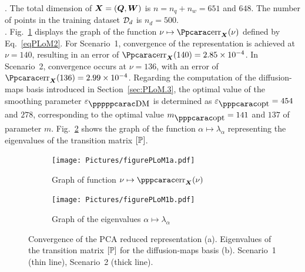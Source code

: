 .
The total dimension of ${\boldsymbol{X}} = ({\boldsymbol{Q}},{\boldsymbol{W}})$ is $n = n_q + n_w = 651$ and $648$. The number of points in the training dataset ${\mathcal{D}}_d$ is $n_d=500$.\\

.
Fig.~\ref{fig:figurePLoM1a} displays the graph of the function  $\nu\mapsto \err_\bfX(\nu)$ defined by Eq.~\eqref{eqPLoM2}.
For Scenario~1, convergence of the representation is achieved at $\nu=140$, resulting in an error of $\err_\bfX(140) = 2.85\times 10^{-4}$. In
Scenario~2, convergence occurs at $\nu=136$,  with an error of $\err_\bfX(136) = 2.99\times 10^{-4}$.
%
Regarding  the computation of the diffusion-maps basis introduced in Section~\ref{sec:PLoM.3}, the optimal value of the smoothing parameter $\varepsilon_\DM$ is determined as $\varepsilon_\opt = 454$ and $278$, corresponding to the optimal value $m_\opt = 141$ and $137$ of parameter $m$. Fig.~\ref{fig:figurePLoM1b} shows the graph of the function $\alpha\mapsto \lambda_\alpha$ representing  the eigenvalues of the transition matrix $[{\mathbb{P}}]$.\\
%
%
\begin{figure}[!htb]
    \begin{center}
        \begin{subfigure}[b]{0.40\textwidth}
            \begin{center}
                \texttt{[image: Pictures/figurePLoM1a.pdf]}
            \end{center}
                \caption{Graph of function $\nu\mapsto \errpp_\bfX(\nu)$}
                \label{fig:figurePLoM1a}
            \end{subfigure}
            \begin{subfigure}[b]{0.40\textwidth}
                \begin{center}
                    \texttt{[image: Pictures/figurePLoM1b.pdf]}
                \end{center}
                \caption{Graph of the eigenvalues $\alpha\mapsto \lambda_\alpha$}
                \label{fig:figurePLoM1b}
            \end{subfigure}
    \end{center}
    \caption[Convergence of the PCA reduced representation. Eigenvalues of the transition matrix for the diffusion-maps basis.]{Convergence of the PCA reduced representation (a). Eigenvalues of the transition matrix $[{\mathbb{P}}]$ for the diffusion-maps basis (b). Scenario~1 (thin line), Scenario~2 (thick line).}
    \label{fig:figurePLoM1}
\end{figure}

